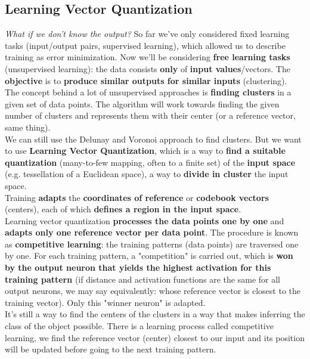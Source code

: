 \subsection{Learning Vector Quantization}
\textit{What if we don't know the output?} So far we've only considered fixed learning tasks (input/output pairs, supervised learning), which allowed us to describe training as error minimization. Now we'll be considering \textbf{free learning tasks} (unsupervised learning): the data consists \textbf{only} of \textbf{input values}/vectors. The \textbf{objective} is to \textbf{produce similar outputs for similar inputs} (clustering).\\

The concept behind a lot of unsupervised approaches is \textbf{finding clusters} in a given set of data points. The algorithm will work towards finding the given number of clusters and represents them with their center (or a reference vector, same thing).\\

We can still use the Delunay and Voronoi approach to find clusters. But we want to use \textbf{Learning Vector Quantization}, which is a way to \textbf{find a suitable quantization} (many-to-few mapping, often to a finite set) of the \textbf{input space} (e.g. tessellation of a Euclidean space), a way to \textbf{divide in cluster} the input space.\\

Training \textbf{adapts} the \textbf{coordinates of reference} or \textbf{codebook vectors} (centers), each of which \textbf{defines a region in the input space}.\\

Learning vector quantization \textbf{processes the data points one by one} and \textbf{adapts only one reference vector per data point}. The procedure is known as \textbf{competitive learning}: the training patterns (data points) are traversed one by one. For each training pattern, a "competition" is carried out, which is \textbf{won by the output neuron that yields the highest activation for this training pattern} (if distance and activation functions are the same for all output neurons, we may say equivalently: whose reference vector is closest to the training vector). Only this "winner neuron" is adapted. \\

It's still a way to find the centers of the clusters in a way that makes inferring the class of the object possible. There is a learning process called competitive learning, we find the reference vector (center) closest to our input and its position will be updated before going to the next training pattern.

